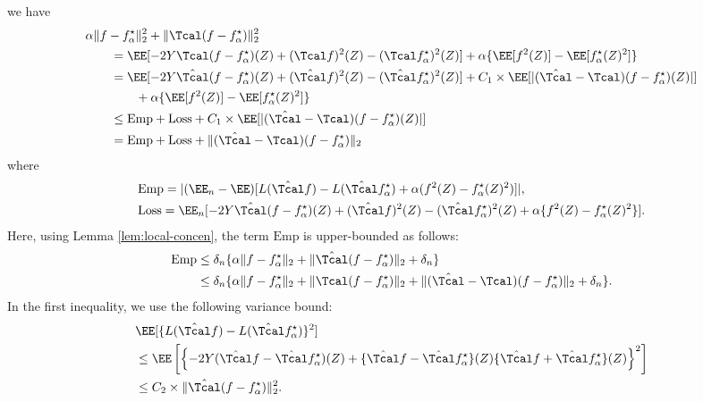 \documentclass[12pt]{extarticle} %
\begin{document}
we have 
\begin{align}\label{eq:single-quadratic}
    & \alpha \|f - f^{\star}_{\alpha} \|^2_2 + \|\Tcal(f-f^{\star}_{\alpha})\|^2_2  \nonumber\\ 
    &\qquad= \EE[ - 2 Y  \Tcal (f-f^{\star}_{\alpha})(Z)  + (\Tcal f)^2(Z) -  (\Tcal f^{\star}_{\alpha})^2(Z) ] +  \alpha\{\EE[f^2(Z)] - \EE[f^{\star}_{\alpha}(Z)^2]\}\nonumber\\
    &\qquad= \EE[ - 2 Y  \hat \Tcal (f-f^{\star}_{\alpha})(Z) + (\hat \Tcal f)^2(Z) - (\hat \Tcal f^{\star}_{\alpha})^2(Z) ]   +  C_1 \times \EE[|(\hat \Tcal - \Tcal) (f-f^{\star}_{\alpha})(Z)|] \nonumber\\ 
    &\qquad\qquad+  \alpha\{\EE[f^2(Z)] - \EE[f^{\star}_{\alpha}(Z)^2]\} \nonumber\\
    &\qquad\leq \mathrm{Emp} + \mathrm{Loss} + C_1 \times \EE[|(\hat \Tcal - \Tcal) (f-f^{\star}_{\alpha})(Z)|]  \nonumber\\ 
    &\qquad= \mathrm{Emp} + \mathrm{Loss} + \|(\hat \Tcal-\Tcal) (  f - f^{\star}_{\alpha})\|_2
\end{align}
where 
\begin{align*}
    &\mathrm{Emp} = |(\EE_n-\EE)  [L(\hat \Tcal f)- L(\hat \Tcal f^{\star}_{\alpha})+\alpha(f^2(Z)-f^{\star}_{\alpha}(Z)^2)]|,  \\ 
    & \mathrm{Loss} =  \EE_n[ -2Y  \hat \Tcal (f-f^{\star}_{\alpha})(Z)  + (\hat \Tcal f)^2(Z) - (\hat \Tcal f^{\star}_{\alpha})^2(Z) + \alpha\{f^2(Z)- f^{\star}_{\alpha}(Z)^2 \}]. 
\end{align*} 
Here, using Lemma \ref{lem:local-concen}, the term $\mathrm{Emp} $ is upper-bounded as follows: 
\begin{align}\label{eq:single-emp}    
  \mathrm{Emp}  &\leq \delta_n\{ \alpha \|f-f^{\star}_{\alpha}\|_2+ \|\hat \Tcal(f-f^{\star}_{\alpha})\|_2+   \delta_n   \} \nonumber\\ 
&\leq \delta_n\{ \alpha \|f-f^{\star}_{\alpha}\|_2 +  \|\Tcal(f-f^{\star}_{\alpha})\|_2 + \|(\hat \Tcal-\Tcal)(f-f^{\star}_{\alpha})\|_2+   \delta_n   \}. 
\end{align} 
In the first inequality, we use the following variance bound: 
\begin{align*}
    &\EE[\{L(\hat \Tcal f)- L(\hat \Tcal f^{\star}_{\alpha})\}^2]\\
    &\leq \EE\left [ \left \{ -2 Y ( \hat \Tcal f - \hat \Tcal f^{\star}_{\alpha})(Z) + \{\hat \Tcal f-\hat \Tcal f^{\star}_{\alpha} \}(Z)\{ \hat \Tcal f + \hat \Tcal f^{\star}_{\alpha}\}(Z) \right \}^2 \right ] \\ 
    &\leq C_2 \times \|\hat \Tcal (  f - f^{\star}_{\alpha})\|^2_2. 
\end{align*}
\end{document}
